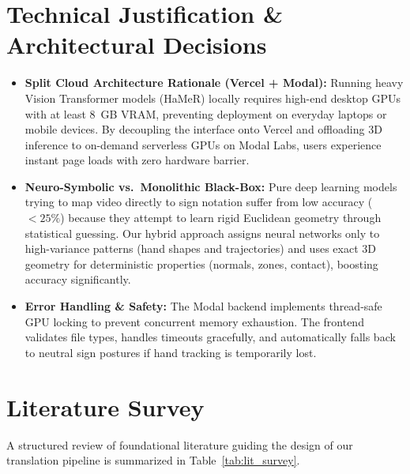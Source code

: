 \documentclass[11pt, a4paper]{article}
\begin{document}
\section{Technical Justification \& Architectural Decisions}
\begin{itemize}[noitemsep, topsep=2pt]
    \item \textbf{Split Cloud Architecture Rationale (Vercel + Modal):} Running heavy Vision Transformer models (HaMeR) locally requires high-end desktop GPUs with at least 8~GB VRAM, preventing deployment on everyday laptops or mobile devices. By decoupling the interface onto Vercel and offloading 3D inference to on-demand serverless GPUs on Modal Labs, users experience instant page loads with zero hardware barrier.
    \item \textbf{Neuro-Symbolic vs.\ Monolithic Black-Box:} Pure deep learning models trying to map video directly to sign notation suffer from low accuracy ($<25\%$) because they attempt to learn rigid Euclidean geometry through statistical guessing. Our hybrid approach assigns neural networks only to high-variance patterns (hand shapes and trajectories) and uses exact 3D geometry for deterministic properties (normals, zones, contact), boosting accuracy significantly.
    \item \textbf{Error Handling \& Safety:} The Modal backend implements thread-safe GPU locking to prevent concurrent memory exhaustion. The frontend validates file types, handles timeouts gracefully, and automatically falls back to neutral sign postures if hand tracking is temporarily lost.
\end{itemize}

\section{Literature Survey}
\noindent
A structured review of foundational literature guiding the design of our translation pipeline is summarized in Table~\ref{tab:lit_survey}.
\end{document}

